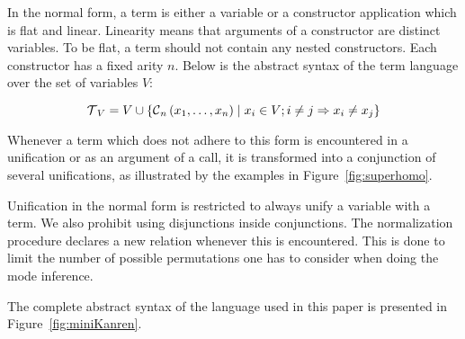 In the normal form, a term is either a variable or a constructor application which is flat and linear.
Linearity means that arguments of a constructor are distinct variables.
To be flat, a term should not contain any nested constructors.
Each constructor has a fixed arity $n$.
Below is the abstract syntax of the term language over the set of variables $V$:

\[  \operatorname{\mathcal{T}}_{V} = V \cup \{\operatorname{\mathcal{C}}_{n}\left( x_1, \ldots, x_{n} \right) \mid x_{i}\in V; i \neq j \Rightarrow x_i \neq x_j\} \]


Whenever a term which does not adhere to this form is encountered in a unification or as an argument of a call, it is transformed into a conjunction of several unifications, as illustrated by the examples in Figure~\ref{fig:superhomo}.

Unification in the normal form is restricted to always unify a variable with a term.
We also prohibit using disjunctions inside conjunctions.
The normalization procedure declares a new relation whenever this is encountered.
This is done to limit the number of possible permutations one has to consider when doing the mode inference.

The complete abstract syntax of the \mk language used in this paper is presented in Figure~\ref{fig:miniKanren}.
